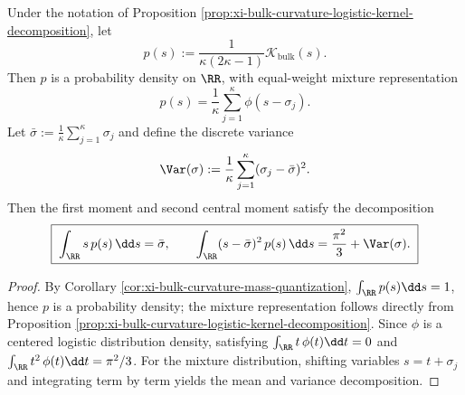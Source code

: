 \begin{corollary}\label{cor:xi-bulk-curvature-probability-moments}
Under the notation of Proposition \ref{prop:xi-bulk-curvature-logistic-kernel-decomposition}, let
\[
p(s):=\frac{1}{\kappa(2\kappa-1)}\mathcal{K}_{\mathrm{bulk}}(s).
\]
Then \(p\) is a probability density on \(\RR\), with equal-weight mixture representation
\[
\boxed{\;
p(s)=\frac{1}{\kappa}\sum_{j=1}^{\kappa}\phi(s-\sigma_j).\;}
\]
Let \(\bar\sigma:=\frac{1}{\kappa}\sum_{j=1}^\kappa\sigma_j\) and define the discrete variance
\[
\Var(\sigma):=\frac{1}{\kappa}\sum_{j=1}^{\kappa}(\sigma_j-\bar\sigma)^2.
\]
Then the first moment and second central moment satisfy the decomposition
\[
\boxed{\;
\int_{\RR}s\,p(s)\,\dd s=\bar\sigma,\qquad
\int_{\RR}(s-\bar\sigma)^2\,p(s)\,\dd s=\frac{\pi^2}{3}+\Var(\sigma).\;}
\]
\end{corollary}
\begin{proof}
By Corollary \ref{cor:xi-bulk-curvature-mass-quantization}, \(\int_{\RR}p(s)\dd s=1\), hence \(p\) is a probability density; the mixture representation follows directly from Proposition \ref{prop:xi-bulk-curvature-logistic-kernel-decomposition}.
Since \(\phi\) is a centered logistic distribution density, satisfying \(\int_{\RR} t\,\phi(t)\dd t=0\) and \(\int_{\RR} t^2\,\phi(t)\dd t=\pi^2/3\).
For the mixture distribution, shifting variables \(s=t+\sigma_j\) and integrating term by term yields the mean and variance decomposition.
\end{proof}

